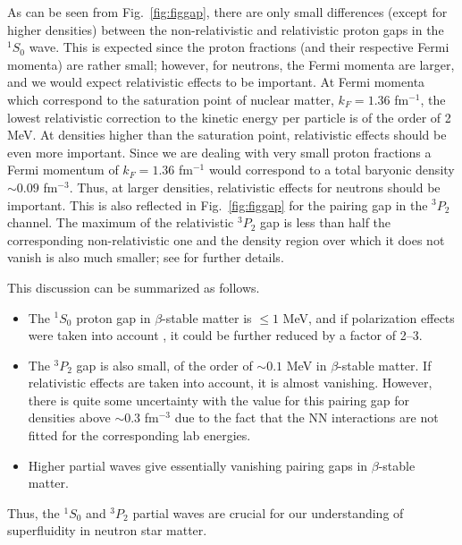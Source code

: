 \documentclass[rmp,aps,floatfix]{revtex4}
\begin{document}
As can be seen from Fig.\ \ref{fig:figgap}, there are only small
differences (except for higher densities) between the non-relativistic
and relativistic proton gaps in the $^1S_0$ wave.
This is expected since the proton fractions (and their respective Fermi
momenta) are rather small; however,
for neutrons, 
the Fermi momenta are larger, and we would 
expect relativistic effects to be important. At Fermi momenta
which correspond to the
saturation point of nuclear matter, $k_F=1.36$ fm$^{-1}$,
the lowest relativistic correction to the kinetic energy per 
particle is of the order of 2 MeV. 
At densities higher than the saturation
point, relativistic effects should be even 
more important.
Since we are dealing with
very small proton fractions a Fermi momentum
of $k_F=1.36$ fm$^{-1}$ would correspond to a total baryonic 
density $\sim 0.09$  fm$^{-3}$. Thus, at larger densities,
relativistic effects for neutrons should
be important.
This is also reflected in Fig.\ \ref{fig:figgap} for the pairing
gap in the $^3P_2$ channel.
The maximum of the relativistic $^3P_2$ gap is less  than half
the corresponding non-relativistic one and the 
density region over which it does not vanish is also much smaller; 
see  \cite{pair1} for further details.

This discussion  can be summarized as follows.
\begin{itemize}
      \item The $^1S_0$ proton gap in $\beta$-stable matter
            is $ \le 1$ MeV, and if polarization
            effects were taken into account \cite{sclbl96},
            it could be further reduced by a factor of 2--3.
      \item The $^3P_2$ gap is also small, of the order
            of $\sim 0.1$ MeV in $\beta$-stable matter.
            If relativistic effects are taken into account,
            it is almost vanishing. However, there is
            quite some uncertainty with the value for this
            pairing gap for densities above $\sim 0.3$
            fm$^{-3}$ due to the fact that the NN interactions
            are not fitted for the corresponding lab energies. 
      \item Higher partial waves give essentially vanishing
            pairing gaps in $\beta$-stable matter.
\end{itemize}
Thus, the $^1S_0$ and $^3P_2$ partial waves are crucial for our
understanding of superfluidity in neutron star matter. 
\end{document}
